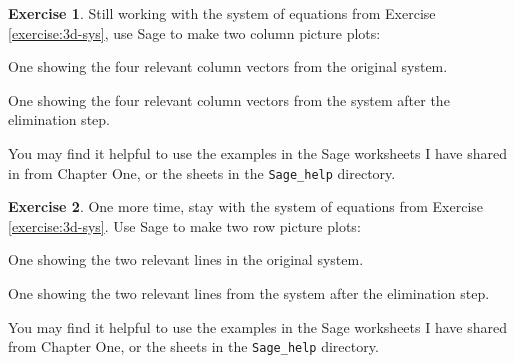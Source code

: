 \documentclass[11pt]{amsart}
\theoremstyle{definition}
\newtheorem{exercise}{Exercise}
\begin{document}
\begin{exercise}
Still working with the system of equations from Exercise \ref{exercise:3d-sys}, use Sage to make two column picture plots:
\begin{compactitem}
\item One showing the four relevant column vectors from the original system.

\item One showing the four relevant column vectors from the system after the elimination step.
\end{compactitem}

You may find it helpful to use the examples in the Sage worksheets I have shared in from Chapter One, or the sheets in the \texttt{Sage\_help} directory.
\end{exercise}

\begin{exercise}
One more time, stay with the system of equations from Exercise \ref{exercise:3d-sys}. Use Sage to make two row picture plots:
\begin{compactitem}
\item One showing the two relevant lines in the original system.

\item One showing the two relevant lines from the system after the elimination step.
\end{compactitem}

You may find it helpful to use the examples in the Sage worksheets I have shared from Chapter One, or the sheets in the \texttt{Sage\_help} directory.
\end{exercise}
\end{document}
